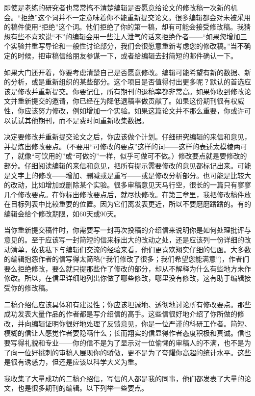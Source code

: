 即使是老练的研究者也常常搞不清楚编辑是否愿意给论文的修改稿一次新的机会。“拒绝”这个词并不一定意味着你不能重新提交论文。很多编辑都会对未被采用的稿件使用“拒绝”这个词。他们拒绝了你的第一稿，却有可能会接受修改稿。我猜想有些不喜欢说“不”的编辑会用一些让人泄气的话来拒绝作者——“如果您增加三个实验并重写导论和一般性讨论部分，我们会很愿意重新考虑您的修改稿。”当不确定的时候，把审稿信给朋友参谋一下，或者给编辑去封简短的邮件确认一下。

如果大门还开着，你要考虑清楚自己是否愿意修改。编辑可能希望有新的数据、新的分析，或是重新组织的某些部分。这个项目是否值得付出更多呢？默认的首选应该是修改并重新提交。你要记住，所有期刊的退稿率都非常高。如果你收到修改论文并重新提交的邀请，你已经在为降低退稿率做贡献了。如果这份期刊很有权威性，你应该努力修改，例如增加一个实验。如果这篇论文并不那么重要，你或许可以试试其他期刊，而不是费时间重新收集数据。

决定要修改并重新提交论文之后，你应该做个计划。仔细研究编辑的来信和意见，并提炼出修改要点。（不要用“可修改的要点”这样的词——这样的表述太模棱两可了，就像“可饮用的”或“可做的”一样，似乎可做可不做。）修改要点就是要修改的部分。仔细阅读编辑的来信和意见，把所有提示需要修改的意见都标记出来。可能是文字上的修改——增加、删减或是重写——或是修改分析部分。也可能是比较大的改动，比如增加或删除某个实验。很多审稿意见天马行空，很长的一篇只有寥寥几个修改要点。在你标出修改要点后，就尽快修改。在第三章里，我把修改稿件放在目标列表中比较重要的位置。因为它们离发表更近，所以不要磨磨蹭蹭的。有的编辑会给个修改期限，如60天或90天。

当你重新提交稿件时，你需要写一封再次投稿的介绍信来说明你是如何处理批评与意见的。至于应该写一封简短的信来标出大的改动之处，还是应该列一份详细的改动清单，依我私下与编辑们交流的经验来看，他们更喜欢翔实仔细的信函。大多数的编辑抱怨作者的信写得太简略(“我们修改了很多；我们希望您能满意”)，作者们要么拒绝修改，要么就只提那些作了修改的部分，却从不解释为什么有些地方未作修改。所以，在信里详细地列出你做了哪些修改，哪里没有修改，这有助于编辑接受你的修改稿。

二稿介绍信应该具体和有建设性；你应该坦诚地、透彻地讨论所有修改要点。那些成功发表大量作品的作者都是写介绍信的高手。这些信很好地介绍了你所做的修改，并向编辑证明你很好地处理了反馈意见，你是一位严谨的科研工作者。简短、模糊的信让人感觉作者要隐瞒什么；长而翔实的信显得作者态度积极和真诚。信也要写得礼貌和专业——你的信不是为了显示对一位偷懒的审稿人的不满，也不是为了向一位好挑刺的审稿人展现你的骄傲，更不是为了夸耀你高超的统计水平。这些是很有诱惑力，但还是应该以科学大义为重。

我收集了大量成功的二稿介绍信，写信的人都是我的同事，他们都发表了大量的论文，也是很多期刊的编辑。以下列举一些要点。

